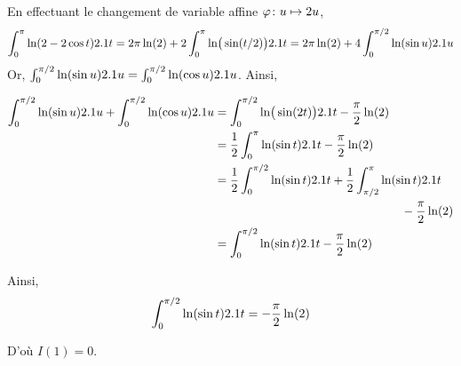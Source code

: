 \begin{solution}
\begin{reponses}
\item En effectuant le changement de variable affine $\fonctionligne[\varphi]{u}{2 u}$,
\begin{align*}
\int_0^\pi \ln(2 - 2 \cos t) \d t
= 2 \pi \ln(2) + 2 \int_0^\pi \ln\mathopen{}\big(\sin(t/2)\big) \d t
= 2 \pi \ln(2) + 4 \int_0^{\pi/2} \ln(\sin u) \d u
\end{align*}
Or, $\int_0^{\pi/2} \ln(\sin u) \d u = \int_0^{\pi/2} \ln(\cos u) \d u$. Ainsi,

\begin{align*}
\int_0^{\pi/2} \ln(\sin u) \d u + \int_0^{\pi/2} \ln(\cos u) \d u
&= \int_0^{\pi/2} \ln\mathopen{}\big(\sin(2 t)\big) \d t - \frac{\pi}{2} \ln(2) \\
&= \frac{1}{2} \int_0^\pi \ln(\sin t) \d t - \frac{\pi}{2} \ln(2) \\
&= \begin{multlined}[t]\frac{1}{2} \int_0^{\pi/2} \ln(\sin t) \d t + \frac{1}{2} \int_{\pi/2}^{\pi} \ln(\sin t) \d t \\
- \frac{\pi}{2} \ln(2)
\end{multlined}\\
&= \int_0^{\pi/2} \ln(\sin t) \d t - \frac{\pi}{2} \ln(2)
\end{align*}

Ainsi,
\[
\int_0^{\pi/2} \ln(\sin t) \d t = -\frac{\pi}{2} \ln(2)
\]

D'où $I(1) = 0$.
\end{reponses}
\end{solution}

